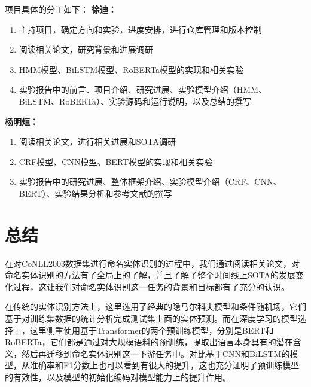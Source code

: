 \documentclass[a4paper, 12pt]{article}
\begin{document}
项目具体的分工如下：
\textbf{徐迪：}
\begin{enumerate}
    \item 主持项目，确定方向和实验，进度安排，进行仓库管理和版本控制
    \item 阅读相关论文，研究背景和进展调研
    \item HMM模型、BiLSTM模型、RoBERTa模型的实现和相关实验
    \item 实验报告中的前言、项目介绍、研究进展、实验模型介绍（HMM、BiLSTM、RoBERTa）、实验源码和运行说明，以及总结的撰写
\end{enumerate}

\textbf{杨明烜：}
\begin{enumerate}
    \item 阅读相关论文，进行相关进展和SOTA调研
    \item CRF模型、CNN模型、BERT模型的实现和相关实验
    \item 实验报告中的研究进展、整体框架介绍、实验模型介绍（CRF、CNN、BERT）、实验结果分析和参考文献的撰写
\end{enumerate}

\section{总结}

在对CoNLL2003数据集进行命名实体识别的过程中，我们通过阅读相关论文，对命名实体识别的方法有了全局上的了解，并且了解了整个时间线上SOTA的发展变化过程，这让我们对命名实体识别这一任务的背景和目标都有了充分的认识。

在传统的实体识别方法上，这里选用了经典的隐马尔科夫模型和条件随机场，它们基于对训练集数据的统计分析完成测试集上面的实体预测。而在深度学习的模型选择上，这里侧重使用基于Transformer的两个预训练模型，分别是BERT和RoBERTa，它们都是通过对大规模语料的预训练，提取出语言本身具有的潜在含义，然后再迁移到命名实体识别这一下游任务中。对比基于CNN和BiLSTM的模型，从准确率和F1分数上也可以看到有很大的提升，这也充分证明了预训练模型的有效性，以及模型的初始化编码对模型能力上的提升作用。




\end{document}
